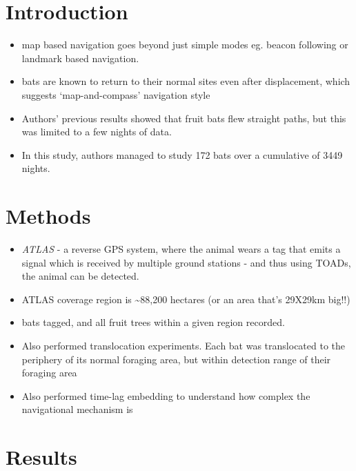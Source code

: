 \documentclass[
]{book}
\providecommand{\tightlist}{%
  \setlength{\itemsep}{0pt}\setlength{\parskip}{0pt}}
\begin{document}
\hypertarget{introduction}{%
\section{Introduction}\label{introduction}}

\begin{itemize}
\tightlist
\item
  map based navigation goes beyond just simple modes eg. beacon following or landmark based navigation.
\item
  bats are known to return to their normal sites even after displacement, which suggests `map-and-compass' navigation style
\item
  Authors' previous results showed that fruit bats flew straight paths, but this was limited to a few nights of data.
\item
  In this study, authors managed to study 172 bats over a cumulative of 3449 nights.
\end{itemize}

\hypertarget{methods}{%
\section{Methods}\label{methods}}

\begin{itemize}
\tightlist
\item
  \emph{ATLAS} - a reverse GPS system, where the animal wears a tag that emits a signal which is received by multiple ground stations - and thus using TOADs, the animal can be detected.
\item
  ATLAS coverage region is \textasciitilde88,200 hectares (or an area that's 29X29km big!!)
\item
  bats tagged, and all fruit trees within a given region recorded.
\item
  Also performed translocation experiments. Each bat was translocated to the periphery of its normal foraging area, but within detection range of their foraging area
\item
  Also performed time-lag embedding to understand how complex the navigational mechanism is
\end{itemize}

\hypertarget{results}{%
\section{Results}\label{results}}
\end{document}
